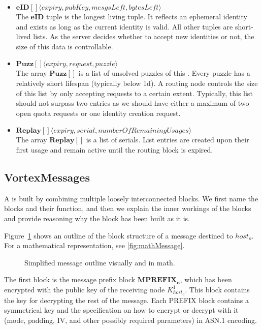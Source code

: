 \begin{itemize}
	\item $\mathbf{eID[]}\langle expiry, pubKey, mesgsLeft, bytesLeft \rangle$\\
	The $\mathbf{eID}$ tuple is the longest living tuple. It reflects an ephemeral identity and exists as long as the current identity is valid. All other tuples are short-lived lists. As the server decides whether to accept new identities or not, the size of this data is controllable. 
	\item $\mathbf{Puzz[]}\langle expiry, request, puzzle \rangle$\\
	The array $\mathbf{Puzz[]}$ is a list of unsolved puzzles of this . Every puzzle has a relatively short lifespan (typically below 1d). A routing node controls the size of this list by only accepting requests to a certain extent. Typically, this list should not surpass two entries as we should have either a maximum of two open quota requests or one identity creation request.
	\item $\mathbf{Replay[]}\langle expiry, serial, numberOfRemainingUsages \rangle$\\
	The array $\mathbf{Replay[]}$ is a list of serials. List entries are created upon their first usage and remain active until the routing block is expired. 
\end{itemize}


\subsection{VortexMessages}\label{sec:vortexMessage}
A \VortexMessage{} is built by combining multiple loosely interconnected blocks. We first name the blocks and their function, and then we explain the inner workings of the blocks and provide reasoning why the block has been built as it is. 

Figure~\ref{fig:messageOutline} shows an outline of the block structure of a message destined to $host_o$. For a mathematical representation, see \cref{fig:mathMessage}.

\begin{figure}[ht]
	\centering\resizebox{.95\linewidth}{!}{
		
	}
	\caption{Simplified message outline visually and in math.}
	\label{fig:messageOutline}
\end{figure}

The first block is the message prefix block $\mathbf{MPREFIX_o}$, which has been encrypted with the public key of the receiving node $K^1_{host_o}$. This block contains the key for decrypting the rest of the message. Each PREFIX block contains a symmetrical key and the specification on how to encrypt or decrypt with it (mode, padding, IV, and other possibly required parameters) in ASN.1 encoding. 

